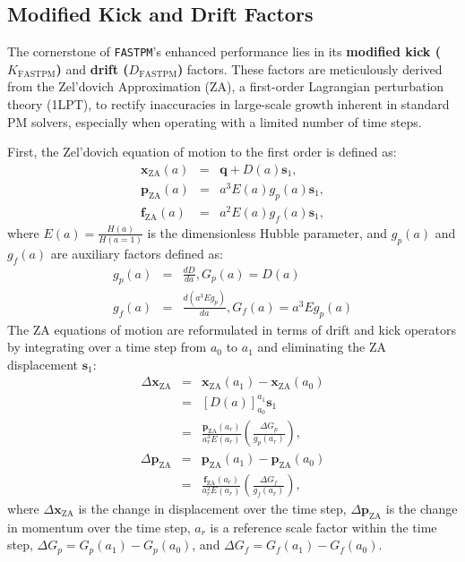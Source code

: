 \subsection{Modified Kick and Drift Factors}
The cornerstone of \texttt{FASTPM}'s enhanced performance lies in its \textbf{modified kick ($K_{\text{FASTPM}}$)} and \textbf{drift ($D_{\text{FASTPM}}$)} factors. These factors are meticulously derived from the Zel'dovich Approximation (ZA), a first-order Lagrangian perturbation theory (1LPT), to rectify inaccuracies in large-scale growth inherent in standard PM solvers, especially when operating with a limited number of time steps.

First, the Zel'dovich equation of motion to the first order is defined as:
\begin{eqnarray}
    \mathbf{x}_{\text{ZA}}(a) &=& \mathbf{q} + D(a)\mathbf{s}_1,  \nonumber \\
    \mathbf{p}_{\text{ZA}}(a) &=& a^3 E(a) g_p(a) \mathbf{s}_1,  \nonumber \\
    \mathbf{f}_{\text{ZA}}(a) &=& a^2 E(a) g_f(a) \mathbf{s}_1, 
\end{eqnarray}
where $E(a) = \frac{H(a)}{H(a=1)}$ is the dimensionless Hubble parameter, and $g_p(a)$ and $g_f(a)$ are auxiliary factors defined as:
\begin{eqnarray}
    g_p(a)  &=& \frac{dD}{da},  G_p(a) = D(a) \\[0.5em]
    g_f(a)  &=& \frac{d(a^3 E g_p)}{da}, G_f(a) = a^3 E g_p(a)
\end{eqnarray}
The ZA equations of motion are reformulated in terms of drift and kick operators by integrating over a time step from $a_0$ to $a_1$ and eliminating the ZA displacement $\mathbf{s}_1$:
\begin{eqnarray}
    \Delta \mathbf{x}_{\text{ZA}} &=& \mathbf{x}_{\text{ZA}}(a_1) - \mathbf{x}_{\text{ZA}}(a_0) \nonumber \\
    &=& \left[ D(a) \right]_{a_0}^{a_1} \mathbf{s}_1 \nonumber \\
    &=& \frac{\mathbf{p}_{\text{ZA}}(a_r)}{a_r^3 E(a_r)} \left( \frac{\Delta G_p}{g_p(a_r)} \right),
\end{eqnarray}
\begin{eqnarray}
    \Delta \mathbf{p}_{\text{ZA}} &=& \mathbf{p}_{\text{ZA}}(a_1) - \mathbf{p}_{\text{ZA}}(a_0) \nonumber \\
    &=& \frac{\mathbf{f}_{\text{ZA}}(a_r)}{a_r^2 E(a_r)} \left( \frac{\Delta G_f}{g_f(a_r)} \right),
\end{eqnarray}
where $\Delta \mathbf{x}_{\text{ZA}}$ is the change in displacement over the time step, $\Delta \mathbf{p}_{\text{ZA}}$ is the change in momentum over the time step, $a_r$ is a reference scale factor within the time step, $\Delta G_p = G_p(a_1) - G_p(a_0)$, and $\Delta G_f = G_f(a_1) - G_f(a_0)$.
